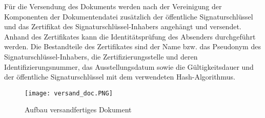 Für die Versendung des Dokuments werden nach der Vereinigung der Komponenten der Dokumentendatei zusätzlich der öffentliche Signaturschlüssel und das Zertifikat des Signaturschlüssel-Inhabers angehängt und versendet. Anhand des Zertifikates kann die Identitätsprüfung des Absenders durchgeführt werden. Die Bestandteile des Zertifikates sind der Name bzw. das Pseudonym des Signaturschlüssel-Inhabers, die Zertifizierungsstelle und deren Identifizierungsnummer, das Ausstellungsdatum sowie die Gültigkeitsdauer und der öffentliche Signaturschlüssel mit dem verwendeten Hash-Algorithmus. \cite{techno1}\cite{techno4}
\begin{figure}[!ht]
    \centering
    \texttt{[image: versand\_doc.PNG]}
    \caption[Aufbau versandfertiges Dokument]{\small{Aufbau versandfertiges Dokument \cite{techno6}}}
\end{figure}